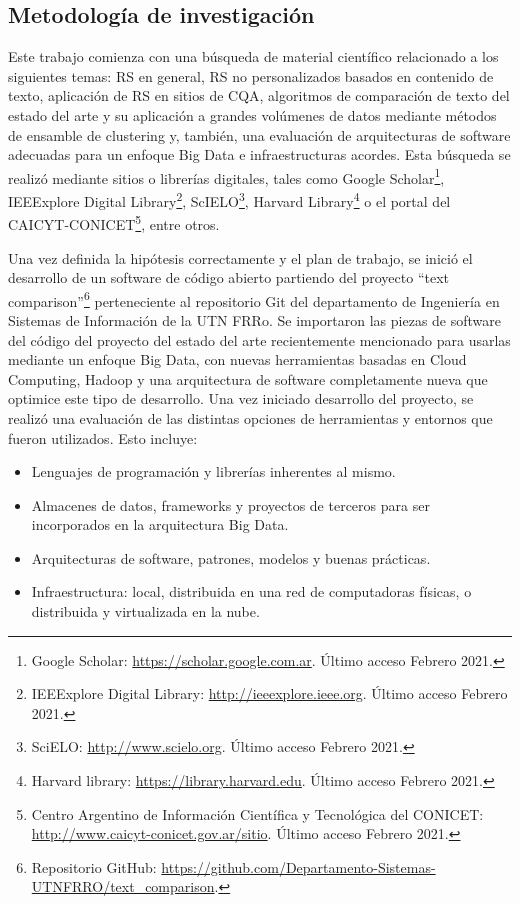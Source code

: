 \subsection{Metodología de investigación}
Este trabajo comienza con una búsqueda de material científico relacionado a los siguientes temas: RS en general, RS no personalizados basados en contenido de texto, aplicación de RS en sitios de CQA, algoritmos de comparación de texto del estado del arte y su aplicación a grandes volúmenes de datos mediante métodos de ensamble de clustering y, también, una evaluación de arquitecturas de software adecuadas para un enfoque Big Data e infraestructuras acordes. Esta búsqueda se realizó mediante sitios o librerías digitales, tales como Google Scholar\footnote{Google Scholar: \url{https://scholar.google.com.ar}. Último acceso Febrero 2021.}, IEEExplore Digital Library\footnote{IEEExplore Digital Library: \url{http://ieeexplore.ieee.org}. Último acceso Febrero 2021.}, ScIELO\footnote{SciELO: \url{http://www.scielo.org}. Último acceso Febrero 2021.}, Harvard Library\footnote{Harvard library: \url{https://library.harvard.edu}. Último acceso Febrero 2021.} o el portal del CAICYT-CONICET\footnote{Centro Argentino de Información Científica y Tecnológica del CONICET: \url{http://www.caicyt-conicet.gov.ar/sitio}. Último acceso Febrero 2021.}, entre otros.

\bigskip Una vez definida la hipótesis correctamente y el plan de trabajo, se inició el desarrollo de un software de código abierto partiendo del proyecto ``text comparison''\footnote{Repositorio GitHub: \url{https://github.com/Departamento-Sistemas-UTNFRRO/text_comparison}.} perteneciente al repositorio Git del departamento de Ingeniería en Sistemas de Información de la UTN FRRo. Se importaron las piezas de software del código del proyecto del estado del arte recientemente mencionado para usarlas mediante un enfoque Big Data, con nuevas herramientas basadas en Cloud Computing, Hadoop y una arquitectura de software completamente nueva que optimice este tipo de desarrollo. Una vez iniciado desarrollo del proyecto, se realizó una evaluación de las distintas opciones de herramientas y entornos que fueron utilizados. Esto incluye:

\begin{itemize}
	\item Lenguajes de programación y librerías inherentes al mismo.
	\item Almacenes de datos, frameworks y proyectos de terceros para ser incorporados en la arquitectura Big Data.
	\item Arquitecturas de software, patrones, modelos y buenas prácticas.
	\item Infraestructura: local, distribuida en una red de computadoras físicas, o distribuida y virtualizada en la nube.
\end{itemize}

